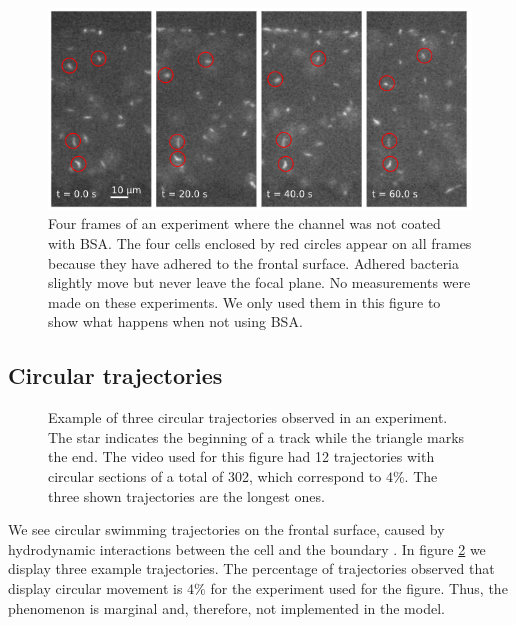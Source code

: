 \begin{figure}
	\centering
	\includegraphics[width=\linewidth]{imagenes/adhesion.PNG}
	\caption[Frames of an experiment not used because the channel was not coated with BSA]{Four frames of an experiment where the channel was not coated with BSA. The four cells enclosed by red circles appear on all frames because they have adhered to the frontal surface. Adhered bacteria slightly move but never leave the focal plane. No measurements were made on these experiments. We only used them in this figure to show what happens when not using BSA. } 
	\label{adhesion}
\end{figure}


\subsection{Circular trajectories}

\begin{figure}
\vspace{-50pt}
\centering

\caption[Circular trajectories near walls]{Example of three circular trajectories observed in an experiment. The star indicates the beginning of a track while the triangle marks the end. The video used for this figure had 12 trajectories with circular sections of a total of 302, which correspond to $4\%$. The three shown trajectories are the longest ones.}
\vspace{-50pt}
\label{circular trajectories}
\end{figure}

We see circular swimming trajectories on the frontal surface, caused by hydrodynamic interactions between the cell and the boundary \cite{Lauga2006SwimmingBoundaries}. In figure \ref{circular trajectories} we display three example trajectories. The percentage of trajectories observed that display circular movement is $4\%$ for the experiment used for the figure. Thus, the phenomenon is marginal and, therefore, not implemented in the model. 

